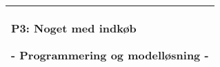 


%
%
%
%
\thispagestyle{empty}
%
  \addtolength{\hoffset}{0.5\evensidemargin-0.5\oddsidemargin} %
  \noindent%
  \begin{tabular}{@{}p{\textwidth}@{}}
    \toprule[2pt]
    \midrule
    \vspace{0.2cm}
    \begin{center}
    \Huge{\textbf{
      P3: Noget med indkøb%
    }}
    \end{center}
    \begin{center}
      \Large{
        - Programmering og modelløsning -%
      }
    \end{center}
    \vspace{0.2cm}\\
    \midrule
    \toprule[2pt]
  \end{tabular}
  \vspace{4 cm}
